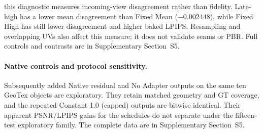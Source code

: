 \documentclass[times,twocolumn,final]{elsarticle}
\providecommand{\DIFadd}[1]{{\protect\color{blue} \sf #1}} %
\providecommand{\DIFaddbegin}{} %
\providecommand{\DIFaddend}{} %
\providecommand{\DIFdelbegin}{} %
\providecommand{\DIFdelend}{} %
\begin{document}
\DIFdelend \DIFaddbegin \DIFadd{this diagnostic measures incoming-view disagreement rather than fidelity. Late-high has a lower mean disagreement than Fixed Mean ($-0.002448$), while Fixed High has still lower disagreement and higher baked LPIPS. Resampling and overlapping UVs also affect this measure; it does not validate seams or PBR. Full controls and contrasts are in Supplementary Section~S5.
}\DIFaddend 

\DIFdelbegin %
\DIFdelend \DIFaddbegin \paragraph{Native controls and protocol sensitivity.}
\DIFadd{Subsequently added Native residual and No Adapter outputs on the same ten GeoTex objects are exploratory. They retain matched geometry and GT coverage, and the repeated Constant 1.0 (capped) outputs are bitwise identical. Their apparent PSNR/LPIPS gains for the schedules do not separate under the fifteen-test exploratory family. The complete data are in Supplementary Section~S5.
}\DIFaddend 
\end{document}
